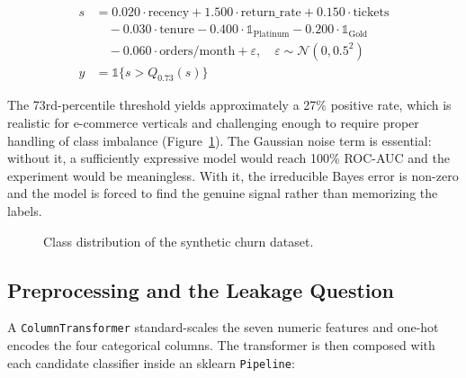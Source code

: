 \documentclass[11pt,a4paper]{article}
\begin{document}
\begin{equation}
\begin{aligned}
s &= 0.020 \cdot \text{recency}
   + 1.500 \cdot \text{return\_rate}
   + 0.150 \cdot \text{tickets} \\
  &\quad - 0.030 \cdot \text{tenure}
        - 0.400 \cdot \mathbb{1}_{\text{Platinum}}
        - 0.200 \cdot \mathbb{1}_{\text{Gold}} \\
  &\quad - 0.060 \cdot \text{orders/month}
        + \varepsilon, \quad \varepsilon \sim \mathcal{N}(0, 0.5^2) \\
y &= \mathbb{1}\{ s > Q_{0.73}(s) \}
\end{aligned}
\end{equation}

The 73rd-percentile threshold yields approximately a 27\% positive
rate, which is realistic for e-commerce verticals and challenging
enough to require proper handling of class imbalance
(Figure~\ref{fig:donut}). The Gaussian noise term is essential:
without it, a sufficiently expressive model would reach 100\% ROC-AUC
and the experiment would be meaningless. With it, the irreducible
Bayes error is non-zero and the model is forced to find the genuine
signal rather than memorizing the labels.

\begin{figure}[h]
\centering
{}
\caption{Class distribution of the synthetic churn dataset.}
\label{fig:donut}
\end{figure}

\subsection{Preprocessing and the Leakage Question}

A \texttt{ColumnTransformer} standard-scales the seven numeric features
and one-hot encodes the four categorical columns. The transformer is
then composed with each candidate classifier inside an sklearn
\texttt{Pipeline}:
\end{document}
